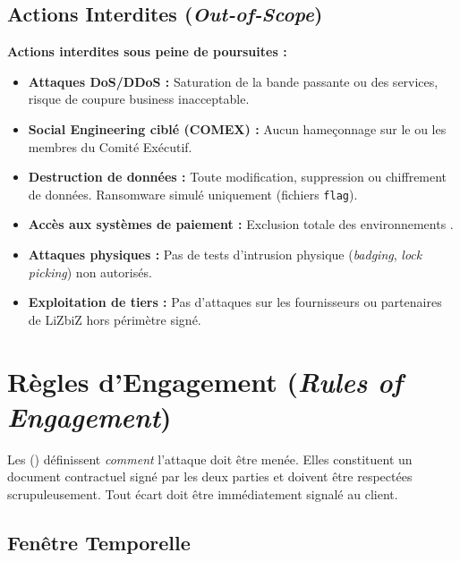 \subsection{Actions Interdites (\textit{Out-of-Scope})}

\begin{boxalert}
\textbf{Actions interdites sous peine de poursuites :}
\begin{itemize}
    \item \textbf{Attaques DoS/DDoS :} Saturation de la bande passante ou des
          services, risque de coupure business inacceptable.
    \item \textbf{Social Engineering ciblé (COMEX) :} Aucun hameçonnage sur le
           ou les membres du Comité Exécutif.
    \item \textbf{Destruction de données :} Toute modification, suppression ou
          chiffrement de données. Ransomware simulé uniquement (fichiers
          \texttt{flag}).
    \item \textbf{Accès aux systèmes de paiement :} Exclusion totale des
          environnements .
    \item \textbf{Attaques physiques :} Pas de tests d'intrusion physique
          (\textit{badging}, \textit{lock picking}) non autorisés.
    \item \textbf{Exploitation de tiers :} Pas d'attaques sur les fournisseurs
          ou partenaires de LiZbiZ hors périmètre signé.
\end{itemize}
\end{boxalert}

\section{Règles d'Engagement (\textit{Rules of Engagement})}
\label{sec:roe}

Les  () définissent \textit{comment}
l'attaque doit être menée. Elles constituent un document contractuel signé par
les deux parties et doivent être respectées scrupuleusement. Tout écart doit être
immédiatement signalé au client.

\subsection{Fenêtre Temporelle}

